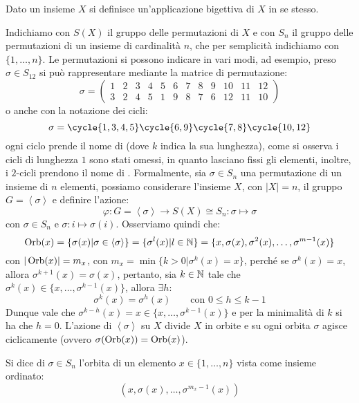 \documentclass[11pt]{scrartcl}
\begin{document}
\begin{definition}
    Dato un insieme $X$ si definisce  un'applicazione bigettiva di $X$ in se stesso.
\end{definition}

Indichiamo con $S(X)$ il gruppo delle permutazioni di $X$ e con $S_n$ il gruppo delle permutazioni di un insieme di cardinalità $n$, che 
per semplicità indichiamo con $\{1,\ldots,n\}$.
Le permutazioni si possono indicare in vari modi, ad esempio, preso $\sigma \in S_{12}$ si può rappresentare mediante la matrice di permutazione:
    \[ \sigma = \left(\begin{array}{cccccccccccc}
        1 & 2 & 3 & 4 & 5 & 6 & 7 & 8 & 9 & 10 & 11 & 12 \\
        3 & 2 & 4 & 5 & 1 & 9 & 8 & 7 & 6 & 12 & 11 & 10 
        \end{array}\right)
        \]
o anche con la notazione dei cicli:
    \[ \sigma = \cycle{1,3,4,5} \cycle{6,9} \cycle{7,8} \cycle{10,12}
            \]
ogni ciclo prende il nome di  (dove $k$ indica la sua lunghezza), come si osserva i cicli di lunghezza $1$ sono stati omessi,
 in quanto lasciano fissi gli elementi, inoltre, i $2$-cicli prendono il nome di . Formalmente, sia $\sigma \in S_n$ una permutazione di un insieme di $n$ elementi,
 possiamo considerare l'insieme $X$, con $|X| = n$, il gruppo $G = \left<\sigma\right>$ e definire l'azione:
    \[ \varphi : G = \left<\sigma\right> \longrightarrow S(X) \cong S_n : \sigma \longmapsto \sigma
        \]
con $\sigma \in S_n$ e $\sigma : i \longmapsto \sigma(i)$. Osserviamo quindi che:
    \[ \operatorname{Orb}(x) = \{\sigma(x) | \sigma \in \left<\sigma\right>\} = \{\sigma^l(x) | l \in \mathbb N\} = \{x, \sigma(x), \sigma^2(x),\ldots,\sigma^{m-1}(x)\}
        \]
con $|\operatorname{Orb}(x)| = m_x$, con $m_x = \min\{k > 0 | \sigma^k(x) = x\}$, perché se $\sigma^k(x) = x$, allora $\sigma^{k+1}(x) = \sigma(x)$, pertanto, sia $k \in \mathbb N$
tale che $\sigma^k(x) \in \{x,\ldots,\sigma^{k-1}(x)\}$, allora $\exists h:$
    \[ \sigma^k(x) = \sigma^h(x)
    \qquad \text{con $0 \leq h \leq k-1$}
        \]
Dunque vale che $\sigma^{k-h}(x) = x \in \{x,\ldots,\sigma^{k-1}(x)\}$ e per la minimalità di $k$ si ha che $h = 0$.
L'azione di $\left<\sigma\right>$ su $X$ divide $X$ in orbite e su ogni orbita $\sigma$ agisce ciclicamente (ovvero $\sigma(\operatorname{Orb}(x)) = \operatorname{Orb}(x)$).

\begin{definition}
    Si dice  di $\sigma \in S_n$ l'orbita di un elemento $x \in \{1,\ldots,n\}$ vista come insieme ordinato:
        \[ (x,\sigma(x),\ldots,\sigma^{m_x-1}(x))
            \]
\end{definition}
\end{document}
